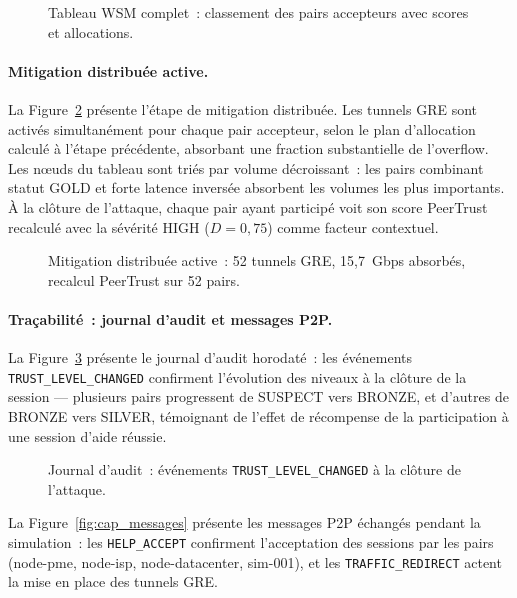 \begin{figure}[H]
\centering
{}
\caption{Tableau WSM complet~: classement des pairs accepteurs avec scores et allocations.}
\label{fig:cap_wsm_full}
\end{figure}

\paragraph{Mitigation distribuée active.}
La Figure~\ref{fig:cap_mitigation} présente l'étape de mitigation distribuée. Les tunnels GRE sont activés simultanément pour chaque pair accepteur, selon le plan d'allocation calculé à l'étape précédente, absorbant une fraction substantielle de l'overflow. Les nœuds du tableau sont triés par volume décroissant~: les pairs combinant statut GOLD et forte latence inversée absorbent les volumes les plus importants. À la clôture de l'attaque, chaque pair ayant participé voit son score PeerTrust recalculé avec la sévérité HIGH ($D = 0{,}75$) comme facteur contextuel.

\begin{figure}[H]
\centering
{}
\caption{Mitigation distribuée active~: 52 tunnels GRE, 15{,}7~Gbps absorbés, recalcul PeerTrust sur 52 pairs.}
\label{fig:cap_mitigation}
\end{figure}

\paragraph{Traçabilité~: journal d'audit et messages P2P.}
La Figure~\ref{fig:cap_db_audit} présente le journal d'audit horodaté~: les événements \texttt{TRUST\_LEVEL\_CHANGED} confirment l'évolution des niveaux à la clôture de la session — plusieurs pairs progressent de SUSPECT vers BRONZE, et d'autres de BRONZE vers SILVER, témoignant de l'effet de récompense de la participation à une session d'aide réussie.

\begin{figure}[H]
\centering
{}
\caption{Journal d'audit~: événements \texttt{TRUST\_LEVEL\_CHANGED} à la clôture de l'attaque.}
\label{fig:cap_db_audit}
\end{figure}

La Figure~\ref{fig:cap_messages} présente les messages P2P échangés pendant la simulation~: les \texttt{HELP\_ACCEPT} confirment l'acceptation des sessions par les pairs (node-pme, node-isp, node-datacenter, sim-001), et les \texttt{TRAFFIC\_REDIRECT} actent la mise en place des tunnels GRE.

